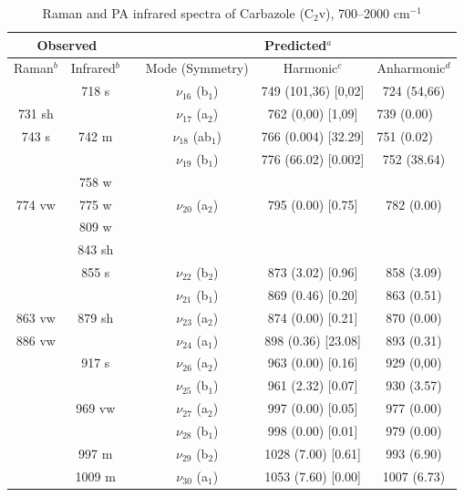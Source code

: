 	\begin{table}[H]
		\caption{Raman and PA infrared spectra of Carbazole (C$_{2}$v), 700–2000 cm$^{-1}$}
		\begin{center}
			\begin{threeparttable}
				\begin{tabular}{c c c c c c}
					\hline
					\multicolumn{ 2}{c}{Observed} & \multicolumn{1}{c}{} & \multicolumn{ 3}{c}{Predicted$^{a}$} \\ \hline
					Raman$^{b}$ & \multicolumn{1}{c}{Infrared$^{b}$} &  & \multicolumn{1}{c}{Mode (Symmetry)} & \multicolumn{1}{c}{Harmonic$^{c}$} & Anharmonic$^{d}$ \\ \hline
& 718 s &  & $\nu_{16}$ (b$_{1}$) & 749 (101,36) [0,02] & 724 (54,66) \\ 
731 sh &  &  & $\nu_{17}$ (a$_{2}$) & 762 (0,00) [1,09] & \multicolumn{1}{l}{ 739 (0.00)} \\
743 s & 742 m & & $\nu_{18}$ (ab$_{1}$) & 766 (0.004) [32.29]&\multicolumn{1}{l}{751 (0.02)} \\ 
&  &  & $\nu_{19}$ (b$_{1}$) & 776 (66.02) [0.002] & 752 (38.64) \\ 
& 758 w &  &  &  &  \\ 
774 vw & 775 w &  &$\nu_{20}$ (a$_{2}$) & 795 (0.00) [0.75] & 782 (0.00) \\ 
& 809 w &  &  &  &  \\ 
& 843 sh &  &  &  &  \\ 
& 855 s &  & $\nu_{22}$ (b$_{2}$) & 873 (3.02) [0.96] & 858 (3.09) \\ 
&  &  & $\nu_{21}$ (b$_{1}$) & 869 (0.46) [0.20] & 863 (0.51) \\
863 vw & 879 sh &  &$\nu_{23}$ (a$_{2}$) & 874 (0.00) [0.21] & 870 (0.00) \\
886 vw &  &  & $\nu_{24}$ (a$_{1}$) & 898 (0.36) [23.08] & 893 (0.31) \\ 
& 917 s &  & $\nu_{26}$ (a$_{2}$) & 963 (0.00) [0.16] & 929 (0,00) \\
&  &  & $\nu_{25}$ (b$_{1}$) & 961 (2.32) [0.07] & 930 (3.57) \\
& 969 vw &  & $\nu_{27}$ (a$_{2}$) & 997 (0.00) [0.05] & 977 (0.00) \\ 
&  &  & $\nu_{28}$ (b$_{1}$) & 998 (0.00) [0.01] & 979 (0.00) \\ 
& 997 m &  & $\nu_{29}$ (b$_{2}$)	 & 1028 (7.00) [0.61] & 993 (6.90) \\ 
 & 1009 m	 &  & $\nu_{30}$ (a$_{1}$)  & 1053 (7.60) [0.00] & 1007 (6.73)	 \\ 

\end{tabular}
\end{threeparttable}
\end{center}
\end{table}
